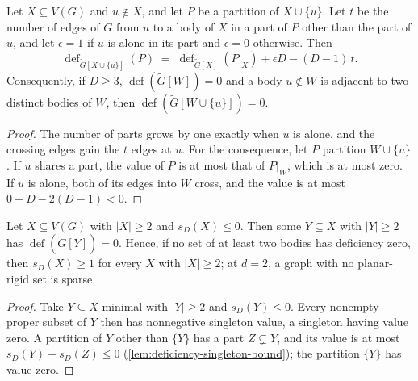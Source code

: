 \begin{lemma}
  \label{lem:deficiency-add-body}
  \leanok
  Let $X \subseteq V(G)$ and $u \notin X$, and let $P$ be a partition of
  $X \cup \{u\}$. Let $t$ be the number of edges of $G$ from $u$ to a
  body of $X$ in a part of $P$ other than the part of $u$, and let
  $\epsilon = 1$ if $u$ is alone in its part and $\epsilon = 0$
  otherwise. Then
  \[
    \operatorname{def}_{\tilde G[X \cup \{u\}]}(P) \;=\;
    \operatorname{def}_{\tilde G[X]}(P|_X) + \epsilon D - (D - 1)\,t.
  \]
  Consequently, if $D \ge 3$, $\operatorname{def}(\tilde G[W]) = 0$ and
  a body $u \notin W$ is adjacent to two distinct bodies of $W$, then
  $\operatorname{def}(\tilde G[W \cup \{u\}]) = 0$.
\end{lemma}
\begin{proof}
  \leanok
  The number of parts grows by one exactly when $u$ is alone, and the
  crossing edges gain the $t$ edges at $u$. For the consequence, let $P$
  partition $W \cup \{u\}$. If $u$ shares a part, the value of $P$ is at
  most that of $P|_W$, which is at most zero. If $u$ is alone, both of
  its edges into $W$ cross, and the value is at most
  $0 + D - 2(D - 1) < 0$.
\end{proof}

\begin{lemma}
  \label{lem:deficiency-sparse}
  \leanok
  Let $X \subseteq V(G)$ with $|X| \ge 2$ and $s_D(X) \le 0$. Then some
  $Y \subseteq X$ with $|Y| \ge 2$ has $\operatorname{def}(\tilde G[Y])
  = 0$. Hence, if no set of at least two bodies has deficiency zero,
  then $s_D(X) \ge 1$ for every $X$ with $|X| \ge 2$; at $d = 2$, a
  graph with no planar-rigid set is sparse.
\end{lemma}
\begin{proof}
  \leanok
  Take $Y \subseteq X$ minimal with $|Y| \ge 2$ and $s_D(Y) \le 0$.
  Every nonempty proper subset of $Y$ then has nonnegative singleton
  value, a singleton having value zero. A partition of $Y$ other than
  $\{Y\}$ has a part $Z \subsetneq Y$, and its value is at most $s_D(Y)
  - s_D(Z) \le 0$ (\cref{lem:deficiency-singleton-bound}); the partition
  $\{Y\}$ has value zero.
\end{proof}

